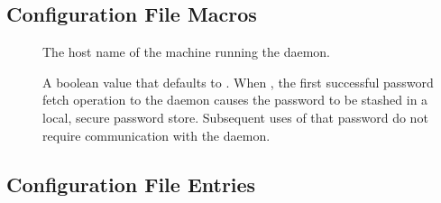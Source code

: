 \subsection{\label{sec:Credd-Config-File-Entries}
Configuration File Macros}
 
\begin{description}

\item[]\label{param:CreddHost}
The host name of the machine running the  daemon.

\item[]\label{param:CreddCacheLocally}
A boolean value that defaults to .
When , the first successful password fetch operation to the
 daemon causes the password to be stashed in a local, 
secure password store.
Subsequent uses of that password do not require
communication with the  daemon.

\end{description}


\subsection{\label{sec:Gridmanager-Config-File-Entries}
Configuration File Entries}

